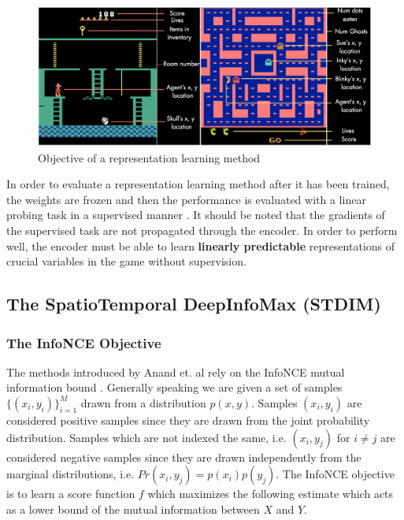\documentclass{article}
\begin{document}
\begin{figure}[H]
    \centering
    \includegraphics[scale=0.32]{objective.PNG}
    \caption{Objective of a representation learning method}
    \label{fig:objective}
\end{figure}

In order to evaluate a representation learning method after it has been trained, the weights are frozen and then the performance is evaluated with a linear probing task in a supervised manner \cite{linear_probing}. It should be noted that the gradients of the supervised task are not propagated through the encoder. In order to perform well, the encoder must be able to learn \textbf{linearly predictable} representations of crucial variables in the game without supervision.

\subsection{The SpatioTemporal DeepInfoMax (STDIM)}
\label{section:stdim}

\subsubsection{The InfoNCE Objective}

The methods introduced by Anand et. al \cite{main_article} rely on the InfoNCE mutual information bound \cite{infoNCE}. Generally speaking we are given a set of samples $\{(x_i, y_i)\}_{i=1}^{M}$ drawn from a distribution $p(x, y)$. Samples $(x_i, y_i)$ are considered positive samples since they are drawn from the joint probability distribution. Samples which are not indexed the same, i.e. $(x_i, y_j)$ for $i\neq j$ are considered negative samples since they are drawn independently from the marginal distributions, i.e. $Pr(x_i, y_j)=p(x_i)p(y_j)$. The InfoNCE objective is to learn a score function $f$ which maximizes the following estimate which acts as a lower bound of the mutual information between $X$ and $Y$.
\end{document}
